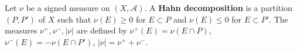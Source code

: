 Let $\nu$ be a signed measure on $(X, \mathcal{A})$. A \textbf{Hahn decomposition} is a partition $(P, P')$ of $X$ such that $\nu(E) \geq 0$ for $E \subset P$ and $\nu(E) \leq 0$ for $E \subset P'$. The measures $\nu^+, \nu^-, |\nu|$ are defined by $\nu^+(E) = \nu(E \cap P)$, $\nu^-(E) = -\nu(E \cap P')$, $|\nu| = \nu^+ + \nu^-$.
